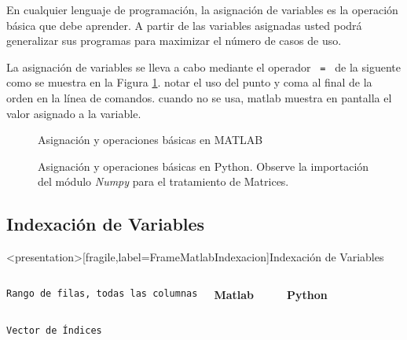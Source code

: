   En cualquier lenguaje de programación, la asignación 
  de variables es la operación básica que debe aprender.
  A partir de las variables asignadas usted podrá generalizar sus
  programas para maximizar el número de casos de uso. 

  La asignación de variables se lleva a cabo mediante
  el operador \texttt{ = } de la siguente como se muestra
  en la Figura \ref{FigAsignacionVariables}. notar el uso 
  del punto y coma al final de la orden en la línea de 
  comandos. cuando no se usa, matlab muestra en pantalla
  el valor asignado a la variable.

\begin{figure}
\caption{Asignación y operaciones básicas en MATLAB\label{FigAsignacionVariables}}
\end{figure}

\begin{figure}
\caption{Asignación y operaciones básicas en Python. Observe la importación del 
        módulo \protect\emph{Numpy} para el tratamiento de Matrices. \protect\label{FigAsignacionVariablesPython}}
\end{figure}

\mode* 

\subsection{Indexación de Variables}

\begin{frame}<presentation>[fragile,label=FrameMatlabIndexacion]{Indexación de Variables}

\begin{columns}[T]
  \vspace{0.5cm}
\hfill \texttt{Rango de filas, todas las columnas}

  \textbf{Matlab}

\begin{codeblock}
  
\end{codeblock}
  \textbf{Python}
\begin{codeblock}
%  
  
\end{codeblock}

\end{columns}
  \vspace{0.5cm}
\begin{columns}[T]
\hfill \texttt{Vector de Índices}

\begin{codeblock}
  
\end{codeblock}

  \begin{codeblock}
    
  \end{codeblock}
\end{columns}
\end{frame}

